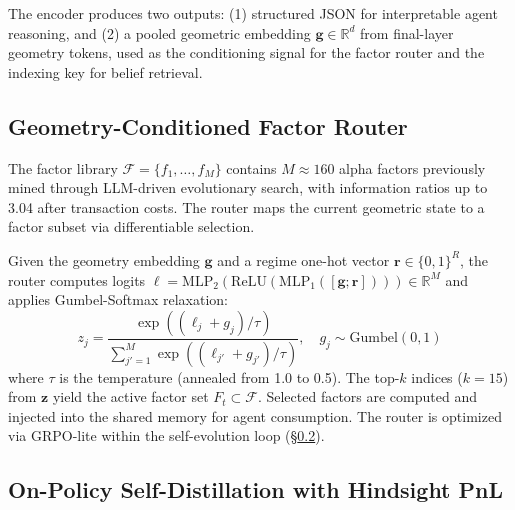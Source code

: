The encoder produces two outputs: (1) structured JSON for interpretable agent reasoning, and (2) a pooled geometric embedding $\mathbf{g} \in \mathbb{R}^d$ from final-layer geometry tokens, used as the conditioning signal for the factor router and the indexing key for belief retrieval.

\subsection{Geometry-Conditioned Factor Router}
\label{sec:router}

The factor library $\mathcal{F} = \{f_1, \ldots, f_M\}$ contains $M \approx 160$ alpha factors previously mined through LLM-driven evolutionary search, with information ratios up to 3.04 after transaction costs. The router maps the current geometric state to a factor subset via differentiable selection.

Given the geometry embedding $\mathbf{g}$ and a regime one-hot vector $\mathbf{r} \in \{0,1\}^R$, the router computes logits $\boldsymbol{\ell} = \mathrm{MLP}_2(\mathrm{ReLU}(\mathrm{MLP}_1([\mathbf{g}; \mathbf{r}]))) \in \mathbb{R}^M$ and applies Gumbel-Softmax relaxation:
\begin{equation}
\label{eq:gumbel}
z_j = \frac{\exp((\ell_j + g_j) / \tau)}{\sum_{j'=1}^{M} \exp((\ell_{j'} + g_{j'}) / \tau)}, \quad g_j \sim \mathrm{Gumbel}(0, 1)
\end{equation}
where $\tau$ is the temperature (annealed from 1.0 to 0.5). The top-$k$ indices ($k{=}15$) from $\mathbf{z}$ yield the active factor set $F_t \subset \mathcal{F}$. Selected factors are computed and injected into the shared memory for agent consumption. The router is optimized via GRPO-lite within the self-evolution loop (\S\ref{sec:opsd}).

\subsection{On-Policy Self-Distillation with Hindsight PnL}
\label{sec:opsd}


